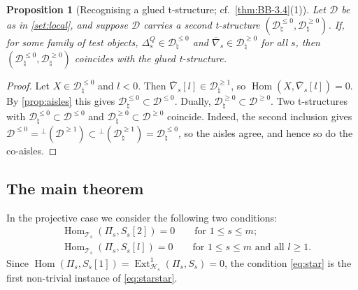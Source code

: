 \documentclass[11pt,reqno]{amsart}
\theoremstyle{plain}
\newtheorem{proposition}[theorem]{Proposition}
\theoremstyle{definition}
\theoremstyle{remark}
\DeclareMathOperator{\Hom}{Hom}
\DeclareMathOperator{\Ext}{Ext}
\newcommand{\nablabar}{\overline{\nabla}}
\newcommand{\cD}{\mathcal{D}}
\newcommand{\cH}{\mathcal{H}}
\newcommand{\cT}{\mathcal{T}}
\begin{document}
\begin{proposition}[Recognising a glued t-structure; cf.\ {\cref{thm:BB-3.4}(1)}]\label{prop:recognise}
Let $\cD$ be as in \cref{set:local}, and suppose $\cD$ carries a second t-structure $(\cD_\natural^{\le0},\cD_\natural^{\ge0})$. If, for some family of test objects, $\Delta^Q_s\in\cD_\natural^{\le0}$ and $\nablabar_s\in\cD_\natural^{\ge0}$ for all $s$, then $(\cD_\natural^{\le0},\cD_\natural^{\ge0})$ coincides with the glued t-structure.
\end{proposition}

\begin{proof}
Let $X\in\cD_\natural^{\le0}$ and $l<0$. Then $\nablabar_s[l]\in\cD_\natural^{\ge1}$, so $\Hom(X,\nablabar_s[l])=0$. By \cref{prop:aisles} this gives $\cD_\natural^{\le0}\subset\cD^{\le0}$. Dually, $\cD_\natural^{\ge0}\subset\cD^{\ge0}$. Two t-structures with $\cD_\natural^{\le0}\subset\cD^{\le0}$ and $\cD_\natural^{\ge0}\subset\cD^{\ge0}$ coincide. Indeed, the second inclusion gives $\cD^{\le0}={}^\perp(\cD^{\ge1})\subset{}^\perp(\cD_\natural^{\ge1})=\cD_\natural^{\le0}$, so the aisles agree, and hence so do the co-aisles.
\end{proof}

\subsection{The main theorem}
In the projective case we consider the following two conditions:
\begin{align}
&\Hom_{\cT_s}(\Pi_s,S_s[2])=0\qquad\text{for }1\le s\le m;\label{eq:star}\tag{$\star$}\\
&\Hom_{\cT_s}(\Pi_s,S_s[l])=0\qquad\text{for }1\le s\le m\text{ and all }l\ge1.\label{eq:starstar}\tag{$\star\star$}
\end{align}
Since $\Hom(\Pi_s,S_s[1])=\Ext^1_{\cH_s}(\Pi_s,S_s)=0$, the condition \eqref{eq:star} is the first non-trivial instance of \eqref{eq:starstar}.
\end{document}
